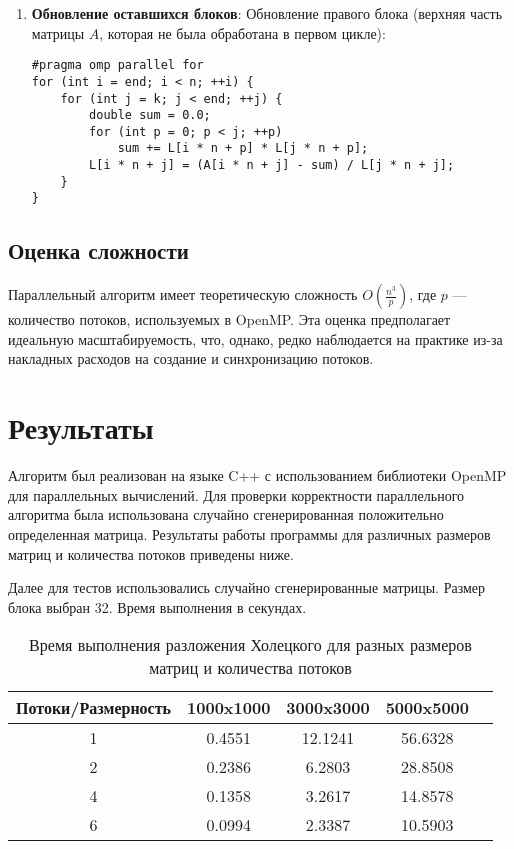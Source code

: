 \documentclass[12pt, russian]{extarticle}
\begin{document}
\begin{spacing}{1.5}
\begin{enumerate}
\begin{enumerate}
\item
\textbf{Обновление оставшихся блоков}:
Обновление правого блока (верхняя часть матрицы \( A \), которая не была обработана в первом цикле):
\begin{verbatim}
#pragma omp parallel for
for (int i = end; i < n; ++i) {
    for (int j = k; j < end; ++j) {
        double sum = 0.0;
        for (int p = 0; p < j; ++p)
            sum += L[i * n + p] * L[j * n + p];
        L[i * n + j] = (A[i * n + j] - sum) / L[j * n + j];
    }
}
\end{verbatim}

\end{enumerate}

\end{enumerate}

\subsection*{Оценка сложности}

Параллельный алгоритм имеет теоретическую сложность \( O\left(\frac{n^3}{p}\right) \), где \( p \) — количество потоков, используемых в OpenMP. Эта оценка предполагает идеальную масштабируемость, что, однако, редко наблюдается на практике из-за накладных расходов на создание и синхронизацию потоков.


\newpage
\section{Результаты}

Алгоритм был реализован на языке C++ с использованием библиотеки OpenMP для параллельных вычислений. Для проверки корректности параллельного алгоритма была использована случайно сгенерированная положительно определенная матрица. Результаты работы программы для различных размеров матриц и количества потоков приведены ниже.

Далее для тестов использовались случайно сгенерированные матрицы. Размер блока выбран 32. Время выполнения в секундах.

\begin{table}[h!]
\centering
\begin{tabular}{|c|c|c|c|c|}
\hline
\textbf{Потоки/Размерность} & \textbf{1000x1000} & \textbf{3000x3000} & \textbf{5000x5000} \\
\hline
1 & 0.4551 & 12.1241 & 56.6328 \\
\hline
2 & 0.2386 & 6.2803 & 28.8508 \\
\hline
4 & 0.1358 & 3.2617 & 14.8578 \\
\hline
6 & 0.0994 & 2.3387 & 10.5903 \\
\hline
\end{tabular}
\caption{Время выполнения разложения Холецкого для разных размеров матриц и количества потоков}
\label{tab:results}
\end{table}



\end{spacing}
\end{document}
